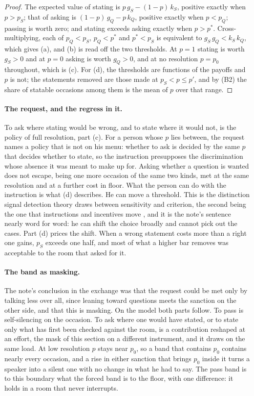 \begin{proof}
The expected value of stating is $p\,g_S - (1-p)\,k_S$, positive exactly when $p > p_S$; that of asking is $(1-p)\,g_Q - p\,k_Q$, positive exactly when $p < p_Q$; passing is worth zero; and stating exceeds asking exactly when $p > p^{*}$. Cross-multiplying, each of $p_Q < p_S$, $p_Q < p^{*}$ and $p^{*} < p_S$ is equivalent to $g_S\,g_Q < k_S\,k_Q$, which gives (a), and (b) is read off the two thresholds. At $p = 1$ stating is worth $g_S > 0$ and at $p = 0$ asking is worth $g_Q > 0$, and at no resolution $p = p_0$ throughout, which is (c). For (d), the thresholds are functions of the payoffs and $p$ is not; the statements removed are those made at $p_S < p \le p'$, and by (B2) the share of statable occasions among them is the mean of $p$ over that range.
\end{proof}

\paragraph{The request, and the regress in it.} To ask where stating would be wrong, and to state where it would not, is the policy of full resolution, part (c). For a person whose $p$ lies between, the request names a policy that is not on his menu: whether to ask is decided by the same $p$ that decides whether to state, so the instruction presupposes the discrimination whose absence it was meant to make up for. Asking whether a question is wanted does not escape, being one more occasion of the same two kinds, met at the same resolution and at a further cost in floor. What the person can do with the instruction is what (d) describes. He can move a threshold. This is the distinction signal detection theory draws between sensitivity and criterion, the second being the one that instructions and incentives move \cite{GreenSwets1966}, and it is the note's sentence nearly word for word: he can shift the choice broadly and cannot pick out the cases. Part (d) prices the shift. When a wrong statement costs more than a right one gains, $p_S$ exceeds one half, and most of what a higher bar removes was acceptable to the room that asked for it.

\paragraph{The band as masking.} The note's conclusion in the exchange was that the request could be met only by talking less over all, since leaning toward questions meets the sanction on the other side, and that this is masking. On the model both parts follow. To pass is self-silencing on the occasion. To ask where one would have stated, or to state only what has first been checked against the room, is a contribution reshaped at an effort, the mask of this section on a different instrument, and it draws on the same load. At low resolution $p$ stays near $p_0$, so a band that contains $p_0$ contains nearly every occasion, and a rise in either sanction that brings $p_0$ inside it turns a speaker into a silent one with no change in what he had to say. The pass band is to this boundary what the forced band is to the floor, with one difference: it holds in a room that never interrupts.

